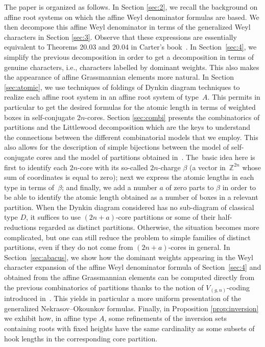 \documentclass[pdftex]{sigma}
\numberwithin{equation}{section}
\begin{document}
The paper is organized as follows. In Section \ref{sec:2}, we recall the background on affine root systems on which the affine Weyl denominator formulas are based. We then decompose this affine Weyl denominator in terms of the generalized Weyl characters in Section \ref{sec:3}. Observe that these expressions are essentially equivalent to Theorems 20.03 and 20.04 in Carter's book~\cite{carter_affine}. In Section~\ref{sec:4}, we simplify the previous decomposition in order to get a decomposition in terms of genuine characters, i.e., characters labelled by dominant weights. This also makes the appearance of affine Grassmannian elements more natural. In Section \ref{sec:atomic}, we use techniques of foldings of Dynkin diagram techniques to
realize each affine root system in an affine root system of type~$A$. This
permits in particular to get the desired formulas for the atomic length in
terms of weighted boxes in self-conjugate $2n$-cores. Section \ref{sec:combi} presents the combinatorics of partitions and the Littlewood decomposition which are the keys to understand the connections between the different combinatorial models that we employ. This also allows for the description of simple bijections between the model of self-conjugate cores and the model
of partitions obtained in~\cite{Wmac}. The~basic idea here is first to
identify each $2n$-core with its so-called $2n$-charge $\beta $ \big(a vector in~$\mathbb{Z}^{2n}$ whose sum of coordinates is equal to zero\big); next we
express the atomic lengths in each type in terms of~$\beta $; and finally, we
add a number $a$ of zero parts to $\beta $ in order to be able to identify the atomic length obtained as a number of boxes in a relevant partition.
When the Dynkin diagram considered has no sub-diagram of classical type $D$,
it suffices to use $(2n+a)$-core partitions or some of their
half-reductions regarded as distinct partitions. Otherwise, the situation becomes more complicated, but one
can still reduce the problem to simple families of distinct partitions, even if
they do not come from $(2n+a)$-cores in general. In Section~\ref{sec:abacus}, we
show how the dominant weights appearing in the Weyl character expansion of
the affine Weyl denominator formula of Section~\ref{sec:4} and obtained from the affine Grassmannian elements can be computed directly
from the previous combinatorics of partitions thanks to the notion of
$V_{(g,n)}$-coding introduced in~\cite{Wmac}. This yields in particular a more uniform presentation of the generalized Nekrasov--Okounkov formulas.
 Finally, in Proposition \ref{prop:inversion} we exhibit how, in affine type $A$, some refinements of the inversion sets containing roots with fixed heights have the same cardinality as some subsets of hook lengths in the corresponding core partition.
\end{document}
